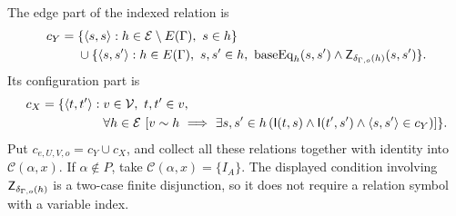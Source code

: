 The edge part of the indexed relation is
\begin{align}
 c_Y={}&
 \{\langle s,s\rangle:
       h\in\mathcal E\setminus E(\Gamma),\ s\in h\}\notag\\
 &{}\cup
 \{\langle s,s'\rangle:
       h\in E(\Gamma),\ s,s'\in h,\
       \operatorname{baseEq}_h(s,s')\land
       \mathsf Z_{\delta_{\Gamma,o}(h)}(s,s')\}.
 \label{sen:cycle-edge-relation}
\end{align}
Its configuration part is
\begin{align}
 c_X=\{\langle t,t'\rangle:\;&v\in\mathcal V,\ t,t'\in v,\notag\\
 &\forall h\in\mathcal E\
 [v\sim h\ \Longrightarrow\
   \exists s,s'\in h\,
    (\mathsf I(t,s)\land\mathsf I(t',s')\land
                           \langle s,s'\rangle\in c_Y)]\}.
 \label{sen:cycle-configuration-relation}
\end{align}
Put \(c_{e,U,V,o}=c_Y\cup c_X\), and collect all these relations together
with identity into \(\mathcal C(\alpha,x)\). If \(\alpha\notin P\),
take \(\mathcal C(\alpha,x)=\{I_A\}\). The displayed condition involving
\(\mathsf Z_{\delta_{\Gamma,o}(h)}\) is a two-case finite disjunction, so
it does not require a relation symbol with a variable index.

